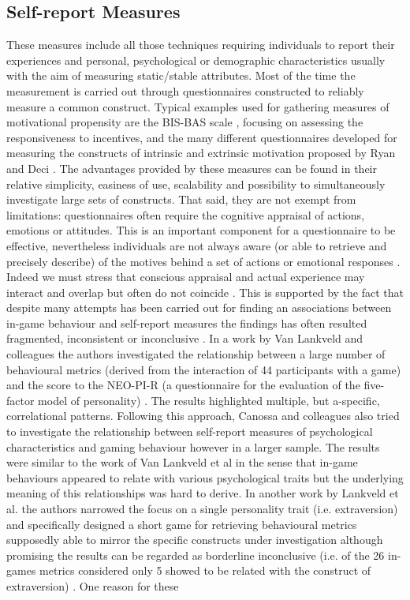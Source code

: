 \subsection{Self-report Measures}
\label{self_report}
These measures include all those techniques requiring individuals to report their experiences and personal, psychological or demographic characteristics usually with the aim of measuring static/stable attributes. Most of the time the measurement is carried out through questionnaires constructed to reliably measure a common construct. Typical examples used for gathering measures of motivational propensity are the BIS-BAS scale \cite{carver1994behavioral}, focusing on assessing the responsiveness to incentives, and the many different questionnaires developed for measuring the constructs of intrinsic and extrinsic motivation proposed by Ryan and Deci \cite{ryan2000self}. The advantages provided by these measures can be found in their relative simplicity, easiness of use, scalability and possibility to simultaneously investigate large sets of constructs. That said, they are not exempt from limitations: questionnaires often require the cognitive appraisal of actions, emotions or attitudes. This is an important component for a questionnaire to be effective, nevertheless individuals are not always aware (or able to retrieve and precisely describe) of the motives behind a set of actions or emotional responses \cite{avserivskis2017computational}. Indeed we must stress that conscious appraisal and actual experience may interact and overlap but often do not coincide \cite{poeller2018let}. This is supported by the fact that despite many attempts has been carried out for finding an associations between in-game behaviour and self-report measures the findings has often resulted fragmented, inconsistent or inconclusive \cite{canossa2013give, stankevicius2015factor, schaekermann2017curiously}. In a work by Van Lankveld and colleagues \cite{van2009psychologically} the authors investigated the relationship between a large number of behavioural metrics (derived from the interaction of 44 participants with a game) and the score to the NEO-PI-R (a questionnaire for the evaluation of the five-factor model of personality) \cite{costa2008revised}. The results highlighted multiple, but a-specific, correlational patterns. Following this approach, Canossa and colleagues \cite{canossa2013give} also tried to investigate the relationship between self-report measures of psychological characteristics and gaming behaviour however in a larger sample. The results were similar to the work of Van Lankveld et al in the sense that in-game behaviours appeared to relate with various psychological traits but the underlying meaning of this relationships was hard to derive. In another work by Lankveld et al. the authors narrowed the focus on a single personality trait (i.e. extraversion)  and specifically designed a short game for retrieving behavioural metrics supposedly able to mirror the specific constructs under investigation  although promising the results can be regarded as borderline inconclusive (i.e. of the 26 in-games metrics considered only 5 showed to be related with the construct of extraversion) \cite{van2011games}. One reason for these 
